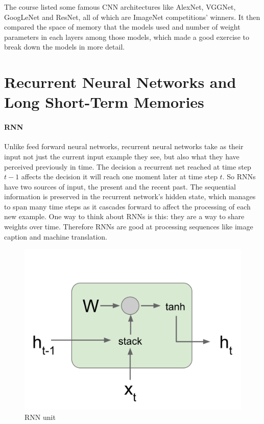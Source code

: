 \documentclass{article} %
\begin{document}
The course listed some famous CNN architectures like AlexNet, VGGNet, GoogLeNet and ResNet, all of which are ImageNet competitions' winners. It then compared the space of memory that the models used and number of weight parameters in each layers among those models, which made a good exercise to break down the models in more detail.


\section{Recurrent Neural Networks and Long Short-Term Memories}

\paragraph{RNN}
Unlike feed forward neural networks, recurrent neural networks take as their input not just the current input example they see, but also what they have perceived previously in time. The decision a recurrent net reached at time step $t-1$ affects the decision it will reach one moment later at time step $t$. So RNNs have two sources of input, the present and the recent past. The sequential information is preserved in the recurrent network’s hidden state, which manages to span many time steps as it cascades forward to affect the processing of each new example. One way to think about RNNs is this: they are a way to share weights over time. Therefore RNNs are good at processing sequences like image caption and machine translation. 

\begin{figure}[H]
	\centering
	\includegraphics[width=.4\textwidth]{rnn-unit.png}
	\caption{RNN unit}
\end{figure}
\end{document}
